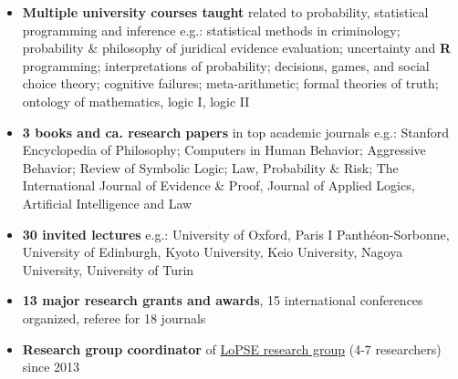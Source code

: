 \documentclass[10pt, a4paper]{article}
\begin{document}
\begin{itemize}[leftmargin=*]
	 \setlength{\itemsep}{0pt}\scriptsize
	\item \normalsize  \textbf{Multiple university courses taught} related to probability, statistical programming and inference
	\newline
	\scriptsize e.g.: statistical methods in criminology; probability \& philosophy of juridical evidence evaluation; uncertainty and \textbf{\textsf{R}} programming; interpretations of probability; decisions, games, and social choice theory; cognitive failures; meta-arithmetic; formal theories of truth; ontology of mathematics, logic I, logic II
	
	\item \normalsize  \textbf{3 books and ca. research papers} in top academic journals\newline
	\scriptsize e.g.: Stanford Encyclopedia of Philosophy; Computers in Human Behavior; Aggressive Behavior; Review of Symbolic Logic; Law, Probability \& Risk; The International Journal of Evidence \& Proof, Journal of Applied Logics, Artificial Intelligence and Law 
	
	\item \normalsize \textbf{30 invited lectures}
	 \newline
	 \scriptsize e.g.: University of Oxford, Paris I Panth\'eon-Sorbonne, University of Edinburgh,   Kyoto University, Keio University, Nagoya University,  University of Turin
	 
	 \vspace{-2mm}	  
	\scriptsize 
	 \item \normalsize  \textbf{13 major research grants and awards}, 15  international conferences organized,   referee for 18  journals
	
	
	\vspace{-2mm} \scriptsize 
	\item \normalsize \textbf{Research group coordinator} of \href{http://lopsegdansk.blogspot.com/p/lopse-team.html}{LoPSE research group} (4-7 researchers) since 2013
		
	
	
\end{itemize}
\thispagestyle{empty}















%
\end{document}
